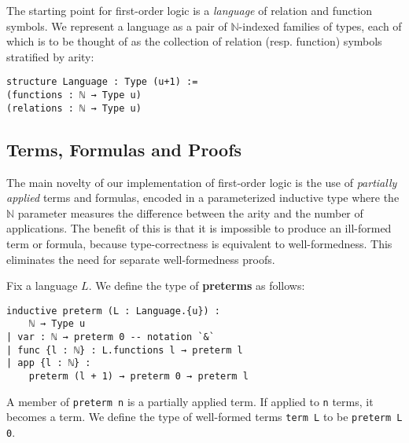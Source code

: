 \documentclass[sigplan,screen]{acmart}
\newcommand{\lil}{\lstinline}
\newcommand{\N}{\mathbb{N}}
\theoremstyle{definition}
\begin{document}
The starting point for first-order logic is a \emph{language} of relation and function symbols.
We represent a language as a pair of $\N$-indexed families of types, each of which is to be thought of as the collection of relation (resp. function) symbols stratified by arity:
\begin{lstlisting}
structure Language : Type (u+1) :=
(functions : ℕ → Type u)
(relations : ℕ → Type u)
\end{lstlisting}
\subsection{Terms, Formulas and Proofs}
\label{subsect:fol:terms}
The main novelty of our implementation of first-order logic is the use of \emph{partially applied} terms and formulas, encoded in a parameterized inductive type where the $\N$ parameter measures the difference between the arity and the number of applications.
The benefit of this is that it is impossible to produce an ill-formed term or formula, because type-correctness is equivalent to well-formedness.
This eliminates the need for separate well-formedness proofs.

Fix a language $L$. We define the type of \textbf{preterms} as follows:
\begin{lstlisting}
inductive preterm (L : Language.{u}) :
    ℕ → Type u
| var : ℕ → preterm 0 -- notation `&`
| func {l : ℕ} : L.functions l → preterm l
| app {l : ℕ} :
    preterm (l + 1) → preterm 0 → preterm l
\end{lstlisting}
A member of \lil{preterm n} is a partially applied term.
If applied to \lil{n} terms, it becomes a term.
We define the type of well-formed terms \lil{term L} to be \lil{preterm L 0}.

\end{document}
